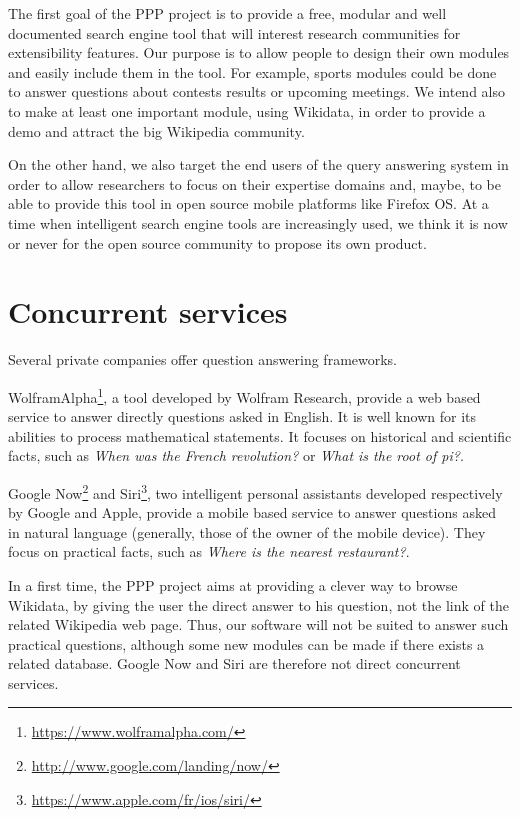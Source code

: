 \documentclass[a4paper,10pt]{article}
\begin{document}
The first goal of the PPP project is to provide a free, modular and well documented search engine tool that will 
interest research communities for extensibility features. Our purpose is to allow people to design their own modules and
easily include them in the tool. For example, sports modules could be done to answer questions about contests results or 
upcoming meetings.  We intend also to make at least one important module, using Wikidata, in order to provide a demo and attract the big Wikipedia community. 

On the other hand, we also target the end users of the query answering system in order to allow researchers to focus on their expertise domains and, maybe, to be able to provide this tool in open source mobile platforms like Firefox OS. At a time when intelligent search engine tools are increasingly used, we think it is now or never for the open source community to propose its own product.

\section{Concurrent services}

Several private companies offer question answering frameworks. 

WolframAlpha\footnote{\url{https://www.wolframalpha.com/}}, a tool developed by 
Wolfram Research, provide a web based service to answer directly questions asked
in English. It is well known for its abilities to process mathematical statements.
It focuses on historical and scientific facts, such as \emph{When was the French 
revolution?} or \emph{What is the root of pi?}.

Google Now\footnote{\url{http://www.google.com/landing/now/}} and Siri\footnote{\url{https://www.apple.com/fr/ios/siri/}}, two intelligent personal assistants
developed respectively by Google and Apple, provide a mobile based service to 
answer questions asked in natural language (generally, those of the owner of the
mobile device). They focus on practical facts, such as \emph{Where is the nearest
restaurant?}.

In a first time, the PPP project aims at providing a clever way to browse Wikidata, by giving the 
user the direct answer to his question, not the link of the related Wikipedia
web page. Thus, our software will not be suited to answer such practical questions,
although some new modules can be made if there exists a related database. Google Now
and Siri are therefore not direct concurrent services.
\end{document}
